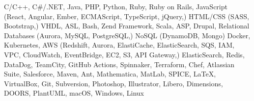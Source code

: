 

\begin{cvparagraph}

C/C++,
C\#/.NET,
Java,
PHP,
Python,
Ruby,
Ruby on Rails,
JavaScript (React, Angular, Ember, ECMAScript, TypeScript, jQuery,)
HTML/CSS (SASS, Bootstrap,)
VHDL,
ASL,
Bash,
Zend Framework,
Scala,
ASP,
Drupal,
Relational Databases (Aurora, MySQL, PostgreSQL,)
NoSQL (DynamoDB, Mongo)
Docker,
Kubernetes,
AWS (Redshift, Aurora, ElastiCache, ElasticSearch, SQS, IAM, VPC, CloudWatch, EventBridge, EC2, S3, API Gateway,)
ElasticSearch,
Redis,
DataDog,
TeamCity,
GitHub Actions,
Spinnaker,
Terraform,
Chef,
Atlassian Suite,
Salesforce,
Maven,
Ant,
Mathematica,
MatLab,
SPICE,
\LaTeX,
VirtualBox,
Git,
Subversion,
Photoshop,
Illustrator,
Libero,
Dimensions,
DOORS,
PlantUML,
macOS,
Windows,
Linux

\end{cvparagraph}
